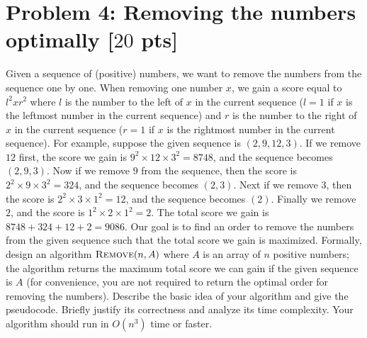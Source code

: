 \documentclass[letterpaper, 11pt]{article}
\newcommand{\1}{\mathds{1}}	%
\theoremstyle{definition}
\newcommand{\problem}[1]{\section*{Problem #1}}
\begin{document}
\problem{4: Removing the numbers optimally [$20$ pts]}
Given a sequence of (positive) numbers, we want to remove the numbers from the sequence one by one.
When removing one number $x$, we gain a score equal to $l^2 x r^2$ where $l$ is the number to the left of $x$ in the current sequence ($l = 1$ if $x$ is the leftmost number in the current sequence) and $r$ is the number to the right of $x$ in the current sequence ($r = 1$ if $x$ is the rightmost number in the current sequence).
For example, suppose the given sequence is $(2,9,12,3)$.
If we remove $12$ first, the score we gain is $9^2 \times 12 \times 3^2 = 8748$, and the sequence becomes $(2,9,3)$.
Now if we remove $9$ from the sequence, then the score is $2^2 \times 9 \times 3^2 = 324$, and the sequence becomes $(2,3)$.
Next if we remove $3$, then the score is $2^2 \times 3 \times 1^2 = 12$, and the sequence becomes $(2)$.
Finally we remove $2$, and  the score is $1^2 \times 2 \times 1^2 = 2$.
The total score we gain is $8748+324+12+2 = 9086$.
Our goal is to find an order to remove the numbers from the given sequence such that the total score we gain is maximized.
Formally, design an algorithm $\textsc{Remove}(n,A)$ where $A$ is an array of $n$ positive numbers; the algorithm returns the maximum total score we can gain if the given sequence is $A$ (for convenience, you are not required to return the optimal order for removing the numbers).
Describe the basic idea of your algorithm and give the pseudocode.
Briefly justify its correctness and analyze its time complexity.
Your algorithm should run in $O(n^3)$ time or faster.
\end{document}
